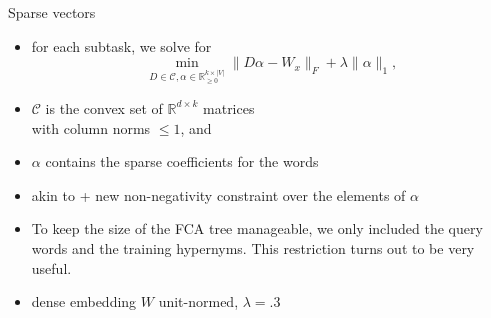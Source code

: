 \documentclass{beamer}
\newlength{\onecolwid}
\begin{document}
\begin{frame}[t]
\begin{columns}[t]
\begin{column}{\onecolwid}
    \begin{block}{Sparse vectors}
      \begin{itemize}
        \item for each subtask, we solve for
          \begin{equation*}
            \min\limits_{D \in \mathcal{C}, \alpha \in
            \mathbb{R}_{\geq0}^{k\times |V|}} \lVert D\alpha - W_{x} \rVert_F + \lambda \lVert \alpha \rVert_1,
            \label{nonneg_SPAMS_objective}
          \end{equation*}
        \item $\mathcal{C}$ is the convex set of $\mathbb{R}^{ d \times k}$
          matrices \\ with column norms $\le 1$, and
        \item $\alpha$ contains the sparse coefficients for the words
        \item akin to \citet{Berend:2017} + new non-negativity constraint over the
          elements of $\alpha$
        \item To keep the size of the FCA tree manageable, we only included the
          query words and the training hypernyms. This restriction turns out to be
          very useful.
        \item dense embedding $W$ unit-normed, $\lambda=.3$

      \end{itemize}
    \end{block}


\end{column}
\end{columns}
\end{frame}
\end{document}
